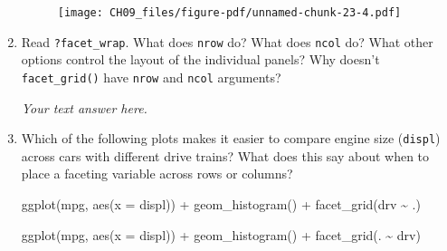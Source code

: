 \documentclass[
  letterpaper,
  DIV=11,
  numbers=noendperiod]{scrreprt}
\newenvironment{Shaded}{\begin{snugshade}}{\end{snugshade}}
\newcommand{\AttributeTok}[1]{\textcolor[rgb]{0.40,0.45,0.13}{#1}}
\newcommand{\FunctionTok}[1]{\textcolor[rgb]{0.28,0.35,0.67}{#1}}
\newcommand{\NormalTok}[1]{\textcolor[rgb]{0.00,0.23,0.31}{#1}}
\newcommand{\SpecialCharTok}[1]{\textcolor[rgb]{0.37,0.37,0.37}{#1}}
\begin{document}
\begin{enumerate}
\begin{tcolorbox}
  \begin{figure}[H]

  {\centering \texttt{[image: CH09\_files/figure-pdf/unnamed-chunk-23-4.pdf]}

  }

  \end{figure}

  \end{tcolorbox}
\item
  Read \texttt{?facet\_wrap}. What does \texttt{nrow} do? What does
  \texttt{ncol} do? What other options control the layout of the
  individual panels? Why doesn't \texttt{facet\_grid()} have
  \texttt{nrow} and \texttt{ncol} arguments?

  \begin{tcolorbox}[enhanced jigsaw, breakable, bottomtitle=1mm, left=2mm, colback=white, toprule=.15mm, leftrule=.75mm, colframe=quarto-callout-note-color-frame, colbacktitle=quarto-callout-note-color!10!white, title={Answer}, coltitle=black, toptitle=1mm, bottomrule=.15mm, opacitybacktitle=0.6, arc=.35mm, rightrule=.15mm, titlerule=0mm, opacityback=0]

  \emph{Your text answer here.}

  \end{tcolorbox}
\item
  Which of the following plots makes it easier to compare engine size
  (\texttt{displ}) across cars with different drive trains? What does
  this say about when to place a faceting variable across rows or
  columns?

\begin{Shaded}
\begin{Highlighting}[]
\FunctionTok{ggplot}\NormalTok{(mpg, }\FunctionTok{aes}\NormalTok{(}\AttributeTok{x =}\NormalTok{ displ)) }\SpecialCharTok{+} 
  \FunctionTok{geom\_histogram}\NormalTok{() }\SpecialCharTok{+} 
  \FunctionTok{facet\_grid}\NormalTok{(drv }\SpecialCharTok{\textasciitilde{}}\NormalTok{ .)}
\end{Highlighting}
\end{Shaded}

\begin{Shaded}
\begin{Highlighting}[]
\FunctionTok{ggplot}\NormalTok{(mpg, }\FunctionTok{aes}\NormalTok{(}\AttributeTok{x =}\NormalTok{ displ)) }\SpecialCharTok{+} 
  \FunctionTok{geom\_histogram}\NormalTok{() }\SpecialCharTok{+}
  \FunctionTok{facet\_grid}\NormalTok{(. }\SpecialCharTok{\textasciitilde{}}\NormalTok{ drv)}
\end{Highlighting}
\end{Shaded}


\end{enumerate}
\end{document}
